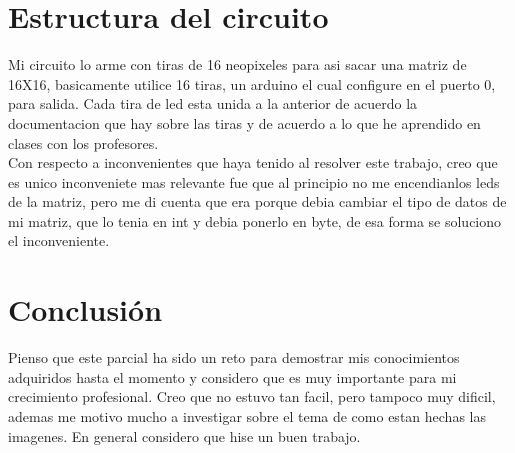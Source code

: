 \documentclass{article}
\begin{document}
\newpage
\section{Estructura del circuito}
Mi circuito lo arme con tiras de 16 neopixeles para asi sacar una matriz de 16X16, basicamente utilice 16 tiras, un arduino el cual configure en el puerto 0, para salida. Cada tira de led esta unida a la anterior de acuerdo la documentacion que hay sobre las tiras y de acuerdo a lo que he aprendido en clases con los profesores.\\
Con respecto a inconvenientes que haya tenido al resolver este trabajo, creo que es unico inconveniete mas relevante fue que al principio no me encendianlos leds de la matriz, pero me di cuenta que era porque debia cambiar el tipo de datos de mi matriz, que lo tenia en int y debia ponerlo en byte, de esa forma se soluciono el inconveniente.
\section{Conclusión}
Pienso que este parcial ha sido un reto  para demostrar mis conocimientos adquiridos hasta el momento y considero que es muy importante para mi crecimiento profesional. Creo que no estuvo tan facil, pero tampoco muy dificil, ademas me motivo mucho a investigar sobre el tema de como estan hechas las imagenes. En general considero que hise un buen trabajo.
\end{document}

